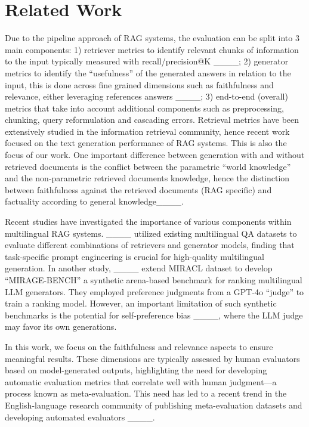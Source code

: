 \section{Related Work}
Due to the pipeline approach of RAG systems, the evaluation can be split into 3 main components: 1) retriever metrics to identify relevant chunks of information to the input typically measured with recall/precision@K ____; 2) generator metrics to identify the “usefulness” of the generated answers in relation to the input, this is done across fine grained dimensions such as faithfulness and relevance, either leveraging references answers ____; 3) end-to-end (overall) metrics that take into account additional components such as preprocessing, chunking, query reformulation and cascading errors. Retrieval metrics have been extensively studied in the information retrieval community, hence recent work focused on the text generation performance of RAG systems. This is also the focus of our work. One important difference between generation with and without retrieved documents is the conflict between the parametric “world knowledge” and the non-parametric retrieved documents knowledge, hence the distinction between faithfulness against the retrieved documents (RAG specific) and factuality according to general knowledge____.


Recent studies have investigated the importance of various components within multilingual RAG systems. ____ utilized existing multilingual QA datasets to evaluate different combinations of retrievers and generator models, finding that task-specific prompt engineering is crucial for high-quality multilingual generation. In another study, ____ extend MIRACL dataset to develop ``MIRAGE-BENCH'' a synthetic arena-based benchmark for ranking multilingual LLM generators. They employed preference judgments from a GPT-4o ``judge'' to train a ranking model. However, an important limitation of such synthetic benchmarks is the potential for self-preference bias ____, where the LLM judge may favor its own generations.

In this work, we focus on the faithfulness and relevance aspects to ensure meaningful results. These dimensions are typically assessed by human evaluators based on model-generated outputs, highlighting the need for developing automatic evaluation metrics that correlate well with human judgment—a process known as meta-evaluation. This need has led to a recent trend in the English-language research community of publishing meta-evaluation datasets and developing automated evaluators ____.

